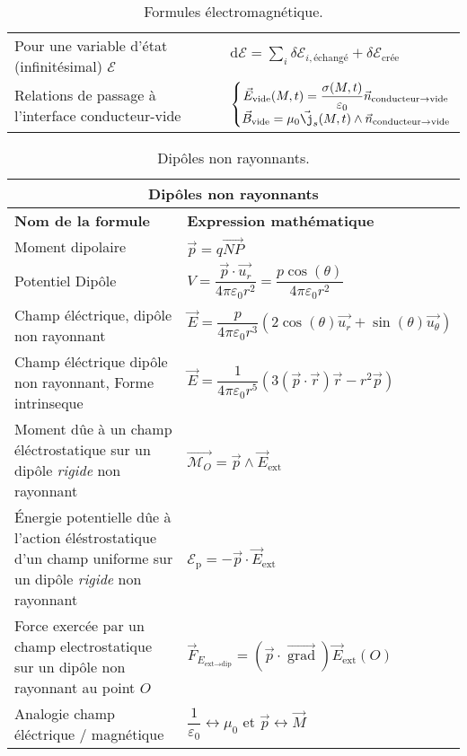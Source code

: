 \documentclass[10pt,a4paper,titlepage,portrait]{article}
\newcommand{\grad}
{
    \vec{\operatorname{grad}}
}
\renewcommand{\arraystretch}{2}
\begin{document}
\begin{table}[H]
\begin{tabular}{@{}p{9cm}p{10cm}@{}}
    Pour une variable d'état (infinitésimal) $\mathcal{E}$ & $\displaystyle \text{d} \mathcal{E} = \sum\limits_{i} \delta\mathcal{E}_{i, \text{échangé}} + \delta \mathcal{E}_{\text{crée}}$ \\ 
    Relations de passage à l'interface conducteur-vide & $\left\{\begin{matrix} \vec{E}_{\text{vide}}(M,t) = \dfrac{\sigma(M,t)}{\varepsilon_0}\vec{n}_{\text{conducteur} \to \text{vide}} \\ \vec{B}_{\text{vide}} = \mu_0 \vec{\j}_s(M,t)\wedge \vec{n}_{\text{conducteur} \to \text{vide}}\end{matrix}\right.$ \\
    \bottomrule
\end{tabular}
\caption{Formules électromagnétique.}
\label{tab:electromag}
\end{table}

\begin{table}[H]
    \centering
    \renewcommand{\arraystretch}{1.5} %
    \setlength{\tabcolsep}{8pt} %
    \begin{tabular}{@{}p{9cm}p{10cm}@{}}
        \toprule
        \multicolumn{2}{c}{\textbf{Dipôles non rayonnants}} \\
        \midrule
        \textbf{Nom de la formule} & \textbf{Expression mathématique} \\
        \midrule
        Moment dipolaire & $\vec p = q \vec{NP}$ \\
        Potentiel Dipôle & $V = \dfrac{\vec{p} \cdot \vec{u_r}}{4\pi \varepsilon_0 r^2} = \dfrac{p\cos(\theta)}{4\pi \varepsilon_0 r^2}$ \\ 
        Champ éléctrique, dipôle non rayonnant & $\vec{E} = \dfrac{p}{4\pi \varepsilon_0 r^3}(2\cos(\theta) \vec{u_r} + \sin(\theta) \vec{u_\theta})$ \\ 
        Champ éléctrique dipôle non rayonnant, Forme intrinseque & $\vec{E} = \dfrac{1}{4\pi\varepsilon_0 r^5}(3(\vec{p} \cdot \vec{r})\vec{r} - r^2\vec{p})$ \\ 
        Moment dûe à un champ éléctrostatique sur un dipôle \textit{rigide} non rayonnant & $\vec{\mathcal{M}_O}=\vec{p}\wedge \vec{E}_{\text{ext}}$ \\
        Énergie potentielle dûe à l'action éléstrostatique d'un champ uniforme sur un dipôle \textit{rigide} non rayonnant & $\mathcal{E}_{\text{p}} = -\vec{p}\cdot\vec{E}_{\text{ext}}$\\
        Force exercée par un champ electrostatique sur un dipôle non rayonnant au point $O$ & $\vec{F}_{E_{\text{ext}\longrightarrow\text{dip}}} = \left(\vec{p}\cdot\grad\right)\vec{E}_{\text{ext}}(O)$\\
        Analogie champ éléctrique $/$ magnétique & $\dfrac{1}{\varepsilon_0} \longleftrightarrow \mu_0$ et $\vec{p} \longleftrightarrow \vec{M}$ \\
                
    \bottomrule
\end{tabular}
\caption{Dipôles non rayonnants.}
\label{tab:denr}
\end{table}
\end{document}
